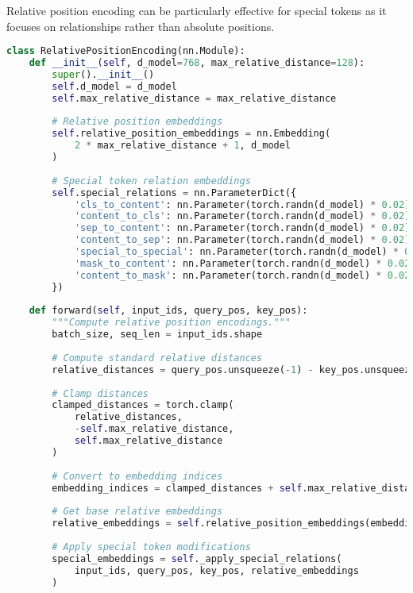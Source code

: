 Relative position encoding can be particularly effective for special tokens as it focuses on relationships rather than absolute positions.

\begin{lstlisting}[language=Python, caption=Relative position encoding with special token awareness]
class RelativePositionEncoding(nn.Module):
    def __init__(self, d_model=768, max_relative_distance=128):
        super().__init__()
        self.d_model = d_model
        self.max_relative_distance = max_relative_distance
        
        # Relative position embeddings
        self.relative_position_embeddings = nn.Embedding(
            2 * max_relative_distance + 1, d_model
        )
        
        # Special token relation embeddings
        self.special_relations = nn.ParameterDict({
            'cls_to_content': nn.Parameter(torch.randn(d_model) * 0.02),
            'content_to_cls': nn.Parameter(torch.randn(d_model) * 0.02),
            'sep_to_content': nn.Parameter(torch.randn(d_model) * 0.02),
            'content_to_sep': nn.Parameter(torch.randn(d_model) * 0.02),
            'special_to_special': nn.Parameter(torch.randn(d_model) * 0.02),
            'mask_to_content': nn.Parameter(torch.randn(d_model) * 0.02),
            'content_to_mask': nn.Parameter(torch.randn(d_model) * 0.02)
        })
        
    def forward(self, input_ids, query_pos, key_pos):
        """Compute relative position encodings."""
        batch_size, seq_len = input_ids.shape
        
        # Compute standard relative distances
        relative_distances = query_pos.unsqueeze(-1) - key_pos.unsqueeze(-2)
        
        # Clamp distances
        clamped_distances = torch.clamp(
            relative_distances,
            -self.max_relative_distance,
            self.max_relative_distance
        )
        
        # Convert to embedding indices
        embedding_indices = clamped_distances + self.max_relative_distance
        
        # Get base relative embeddings
        relative_embeddings = self.relative_position_embeddings(embedding_indices)
        
        # Apply special token modifications
        special_embeddings = self._apply_special_relations(
            input_ids, query_pos, key_pos, relative_embeddings
        )
        

\end{lstlisting}
